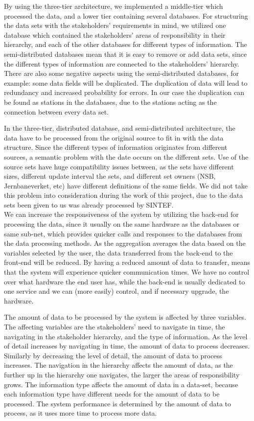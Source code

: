 By using the three-tier architecture, we implemented a middle-tier which 
processed the data, and a lower tier containing several databases. For
structuring the data sets with the stakeholders' requirements in mind, we
utilized one database which contained the stakeholders' areas of responsibility in
their hierarchy, and each of the other databases for different types of 
information. The semi-distributed databases mean that it is easy to remove or
add data sets, since the different types of information are connected to the
stakeholders' hierarchy. There are also some negative aspects using
the semi-distributed databases, for example: some data fields
will be duplicated. The duplication of data will lead to redundancy and
increased probability for errors. In our case the duplication can be found as stations in the databases, due to the stations acting as the
connection between every data set. 

In the three-tier, distributed database, 
and semi-distributed architecture, the data have to be processed from the 
original source to fit in with the data structure. Since the different types of
information originates from different sources, a semantic problem with the date
occurs on the different sets. Use of the source sets have huge compatibility 
issues between, as the sets have different sizes, different update interval
the sets, and different set owners (NSB, Jernbaneverket, etc) have different
definitions of the same fields. We did not take this problem into consideration
during the work of this project, due to the data sets been given to us was 
already processed by SINTEF. 
\\

We can increase the responsiveness of the system by utilizing the back-end for 
processing the data, since it usually on the same hardware as the databases or 
same sub-net, which provides quicker calls and responses to the databases from 
the data processing methods. As the aggregation averages the data based on the variables selected by the user, the data transferred from the back-end to the front-end will be reduced. By having a reduced amount of data to transfer, means that the system will experience quicker communication times. We 
have no control over what hardware the end user has, while the back-end 
is usually dedicated to one service and we can (more easily) control, and if 
necessary upgrade, the hardware.

The amount of data to be processed by the system is affected by three 
variables. The affecting variables are the stakeholders' need to navigate in 
time, the navigating in the stakeholder hierarchy, and the type of information.
As the level of detail increases by navigating in time, the amount of data to 
process decreases. Similarly by decreasing the level of detail, the amount of 
data to process increases. The navigation in the hierarchy affects the amount 
of data, as the further up in the hierarchy one navigates, the larger the 
areas of responsibility grows. The information type affects the amount of data 
in a data-set, because each information type have different needs for the 
amount of data to be processed. The system performance is determined by the 
amount of data to process, as it uses more time to process more data. 


